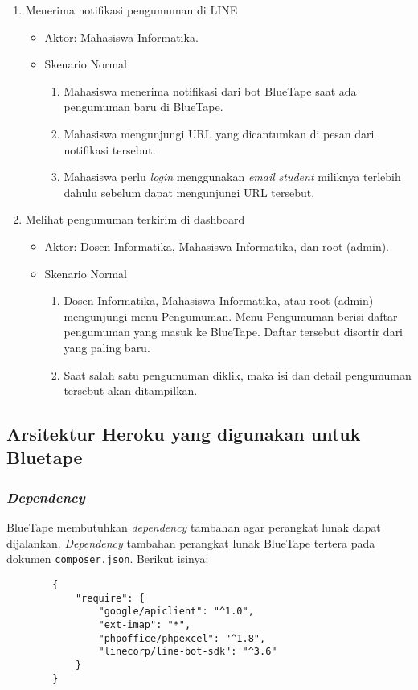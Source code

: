 \begin{enumerate}
\item Menerima notifikasi pengumuman di LINE

\begin{itemize}
	\item Aktor: Mahasiswa Informatika.
	\item Skenario Normal

	\begin{enumerate}
		\item Mahasiswa menerima notifikasi dari bot BlueTape saat ada pengumuman baru di BlueTape.
		\item Mahasiswa mengunjungi URL yang dicantumkan di pesan dari notifikasi tersebut. 
		\item Mahasiswa perlu \textit{login} menggunakan \textit{email} \textit{student} miliknya terlebih dahulu sebelum dapat mengunjungi URL tersebut.
	\end{enumerate}
\end{itemize}

\item Melihat pengumuman terkirim di dashboard

\begin{itemize}
	\item Aktor: Dosen Informatika, Mahasiswa Informatika, dan root (admin).
	\item Skenario Normal

	\begin{enumerate}
		\item Dosen Informatika, Mahasiswa Informatika, atau root (admin) mengunjungi menu Pengumuman. Menu Pengumuman berisi daftar pengumuman yang masuk ke BlueTape. Daftar tersebut disortir dari yang paling baru.
		\item Saat salah satu pengumuman diklik, maka isi dan detail pengumuman tersebut akan ditampilkan.
	\end{enumerate}
\end{itemize}
\end{enumerate}

\subsection{Arsitektur Heroku yang digunakan untuk Bluetape}
	\subsubsection{\textit{Dependency}}
		BlueTape membutuhkan \textit{dependency} tambahan agar perangkat lunak dapat dijalankan. \textit{Dependency} tambahan perangkat lunak BlueTape tertera pada dokumen \texttt{composer.json}. Berikut isinya:
		\begin{lstlisting}
		{
		    "require": {
		        "google/apiclient": "^1.0",
				"ext-imap": "*",
		        "phpoffice/phpexcel": "^1.8",
		        "linecorp/line-bot-sdk": "^3.6"
		    }
		}
		\end{lstlisting}
		
